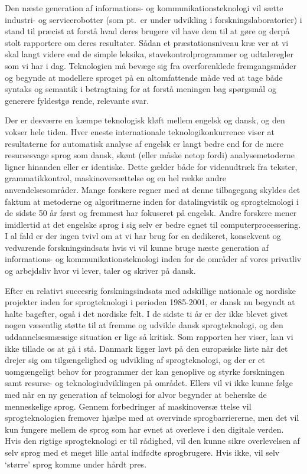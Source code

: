 \begin{multicols}{2}
Den n\ae ste generation af informations- og kommunikationsteknologi
vil s\ae tte industri- og servicerobotter (som pt.\ er under udvikling
i forskningslaboratorier) i stand til pr\ae cist at \mbox{forst\aa}
hvad deres brugere vil have dem til at g\o re og \mbox{derp\aa} stolt
rapportere om deres resultater. S\aa dan et pr\ae stationsniveau kr\ae
ver at vi skal langt videre end de simple leksika,
stavekontrolprogrammer og udtaleregler som vi har i dag. Teknologien
\mbox{m\aa} bev\ae ge sig fra overforenklede fremgangsm\aa der og
begynde at modellere sproget \mbox{p\aa} en altomfattende m\aa de ved
at tage b\aa de syntaks og semantik i betragtning for at
\mbox{forst\aa} meningen bag sp\o rgsm\aa l og generere fyldestg\o
rende, relevante svar.

Der er desv\ae rre en k\ae mpe teknologisk kl\o ft mellem engelsk og
dansk, og den vokser hele tiden. Hver eneste internationale
teknologikonkurrence viser at resultaterne for automatisk analyse af
engelsk er langt bedre end for de mere resursesvage sprog som dansk,
sk\o nt (eller m\aa ske netop fordi) analysemetoderne ligner hinanden
eller er identiske. Dette g\ae lder b\aa de for videnudtr\ae k fra
tekster, grammatikkontrol, maskinovers\ae ttelse og en hel r\ae kke
andre anvendelsesomr\aa der. Mange forskere regner med at denne
tilbagegang skyldes det faktum at metoderne og algoritmerne inden for
datalingvistik og sprogteknologi i de sidste 50 \aa r f\o rst og
fremmest har fokuseret \mbox{p\aa} engelsk. Andre forskere mener
imidlertid at det engelske sprog i sig selv er bedre egnet til
computerprocessering.  I al fald er der ingen tvivl om at vi har brug
for en dedikeret, konsekvent og vedvarende forskningsindsats hvis vi
vil kunne bruge n\ae ste generation af informations- og
kommunikationsteknologi inden for de omr\aa der af vores privatliv
og arbejdsliv hvor vi lever, taler og skriver \mbox{p\aa} dansk.

Efter en relativt succesrig forskningsindsats med adskillige nationale
og nordiske projekter inden for sprogteknologi i perioden 1985-2001,
er dansk nu begyndt at halte bagefter, \mbox{ogs\aa} i det nordiske
felt. I de sidste ti \aa r er der ikke blevet givet nogen v\ae sentlig
st\o tte til at fremme og udvikle dansk sprogteknologi, og den
uddannelsesm\ae ssige situation er lige \mbox{s\aa} kritisk. Som
rapporten her viser, kan vi ikke tillade os at \mbox{g\aa} i
\mbox{st\aa}.  Danmark ligger lavt \mbox{p\aa} den europ\ae iske liste
n\aa r det drejer sig om tilg\ae ngelighed og udvikling af
sprogteknologi, og der er et uomg\ae ngeligt behov for programmer der
kan genoplive og styrke forskningen samt resurse- og
teknologiudviklingen \mbox{p\aa} omr\aa det.  Ellers vil vi ikke kunne
f\o lge med n\aa r en ny generation af teknologi for alvor begynder at
beherske de menneskelige sprog. Gennem forbedringer af maskinovers\ae
ttelse vil sprogteknologien fremover hj\ae lpe med at overvinde
sprogbarriererne, men det vil kun fungere mellem de sprog som har
evnet at overleve i den digitale verden. Hvis den rigtige
sprogteknologi er til r\aa dighed, vil den kunne sikre overlevelsen af
selv sprog med et meget lille antal indf\o dte sprogbrugere. Hvis
ikke, vil selv `st\o rre' sprog komme under h\aa rdt pres.



\end{multicols}
